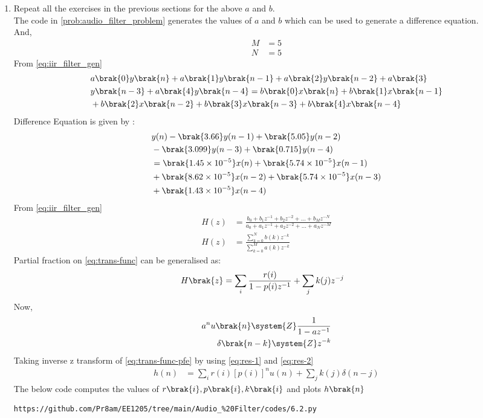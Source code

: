 \documentclass[journal,12pt,twocolumn]{IEEEtran}
\theoremstyle{remark}
\begin{document}
\begin{enumerate}[label=\thesection.\arabic*]
\item Repeat all the exercises in the previous sections for the above $a$ and $b$.\\
\solution The code in \ref{prob:audio_filter_problem} generates the values of $a$ and $b$  which can be used to generate a difference equation.\\
And,
\begin{align}
    M &= 5\\
    N&=5
\end{align}
From \ref{eq:iir_filter_gen} 
\begin{align}
    &a\brak{0}y\brak{n} + a\brak{1}y\brak{n-1}+a\brak{2}y\brak{n-2}+a\brak{3}\\ \notag &y\brak{n-3} + a\brak{4}y\brak{n-4} =   b\brak{0}x\brak{n} + b\brak{1}x\brak{n-1}\\ \notag &+b\brak{2}x\brak{n-2}+b\brak{3}x\brak{n-3} + b\brak{4}x\brak{n-4} 
\end{align}
Difference Equation is given by :
\begin{align}
	&y(n) - \brak{3.66}y(n - 1) + \brak{5.05}y(n - 2) \nonumber \\
	&- \brak{3.099}y(n - 3) + \brak{0.715}y(n - 4) \nonumber \\
	&= \brak{1.45\times 10^{-5}}x(n) + \brak{5.74 \times 10^{-5}}x(n - 1) \nonumber \\
	&+ \brak{8.62 \times 10^{-5}}x(n - 2) + \brak{5.74 \times 10^{-5}}x(n - 3) \nonumber \\
	&+ \brak{1.43 \times 10^{-5}}x(n - 4)
\end{align}
From \eqref{eq:iir_filter_gen} 
\begin{align}
    H(z) &= \frac{b_0 + b_1 z^{-1} + b_2 z^{-2} + \ldots + b_M z^{-N}}{a_0 + a_1 z^{-1} + a_2 z^{-2} + \ldots + a_N z^{-M}}\\
    H(z) &= \frac{\sum_{k = 0}^{N}b(k)z^{-k}}{\sum_{k = 0}^{M}a(k)z^{-k}} \label{eq:trans-func}
\end{align}
Partial fraction on \eqref{eq:trans-func} can be generalised as:
\begin{align}
    H\brak{z}&= \sum_{i}\frac{r(i)}{1 - p(i)z^{-1}} + \sum_{j}k(j)z^{-j}
	\label{eq:trans-func-pfe}
\end{align}
Now,
\begin{align}
    a^{n}u\brak{n} \system{Z} \frac{1}{1-az^{-1}} \label{eq:res-1}\\
    \delta\brak{n-k} \system{Z} z^{-k}\label{eq:res-2}
\end{align}
Taking inverse z transform of \eqref{eq:trans-func-pfe} by using \eqref{eq:res-1} and \eqref{eq:res-2}
\begin{align}
h(n) &= \sum_{i}r(i)[p(i)]^nu(n) + \sum_{j}k(j)\delta(n - j)
	\label{eq:h-n-expr}
\end{align}
The below code computes the values of $r\brak{i},p\brak{i} , k\brak{i}$ and plots $h\brak{n}$
\begin{lstlisting}
https://github.com/Pr8am/EE1205/tree/main/Audio_%20Filter/codes/6.2.py
\end{lstlisting}



\end{enumerate}
\end{document}
